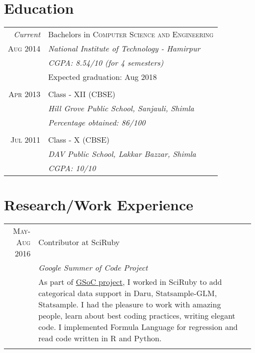 \documentclass[a4paper,10pt]{article}
\begin{document}
\section{Education}
\begin{tabular}{r|p{11cm}}
 \emph{Current} & Bachelors in \textsc{Computer Science and Engineering}\\\textsc{Aug 2014}&\emph{National Institute of Technology - Hamirpur}\\&\emph{CGPA: 8.54/10 (for 4 semesters)}\\&\footnotesize{Expected graduation: Aug 2018}\\\multicolumn{2}{c}{} \\
 \textsc{Apr 2013} & Class - XII (CBSE) \\&\emph{Hill Grove Public School, Sanjauli, Shimla}\\&\emph{Percentage obtained: 86/100}\\\multicolumn{2}{c}{} \\
\textsc{Jul 2011} & Class - X (CBSE) \\&\emph{DAV Public School, Lakkar Bazzar, Shimla}\\&\emph{CGPA: 10/10 }
\end{tabular}

\section{Research/Work Experience}
\begin{tabular}{r|p{11cm}}
 \textsc{May-Aug 2016} & Contributor at SciRuby \\&\emph{Google Summer of Code Project}\\&\footnotesize{As part of \href{https://summerofcode.withgoogle.com/projects/#6288543399804928}{GSoC project}, I worked in SciRuby to add categorical data support in Daru, Statsample-GLM, Statsample. I had the pleasure to work with amazing people, learn about best coding practices, writing elegant code. I implemented Formula Language for regression and read code written in R and Python.}\\\multicolumn{2}{c}{} \\

\end{tabular}

\end{document}
